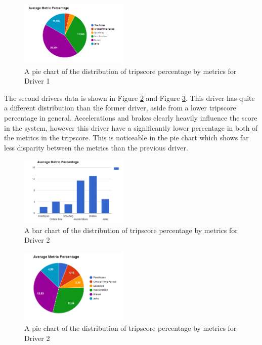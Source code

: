 \begin{figure}[tb]
\centering
\includegraphics[width=0.465\textwidth]{Pictures/car8amppie}
\caption{A pie chart of the distribution of tripscore percentage by metrics for Driver 1}
\label{fig:car8amppie}
\end{figure}

The second drivers data is shown in Figure \ref{fig:car21ampbar} and Figure \ref{fig:car21amppie}. This driver has quite a different distribution than the former driver, aside from a lower tripscore percentage in general. Accelerations and brakes clearly heavily influence the score in the system, however this driver have a significantly lower percentage in both of the metrics in the tripscore. This is noticeable in the pie chart which shows far less disparity between the metrics than the previous driver. 

\begin{figure}[tb]
\centering
\includegraphics[width=0.465\textwidth]{Pictures/car21ampbar}
\caption{A bar chart of the distribution of tripscore percentage by metrics for Driver 2}
\label{fig:car21ampbar}
\end{figure}

\begin{figure}[tb]
\centering
\includegraphics[width=0.465\textwidth]{Pictures/car21amppie}
\caption{A pie chart of the distribution of tripscore percentage by metrics for Driver 2}
\label{fig:car21amppie}
\end{figure}


